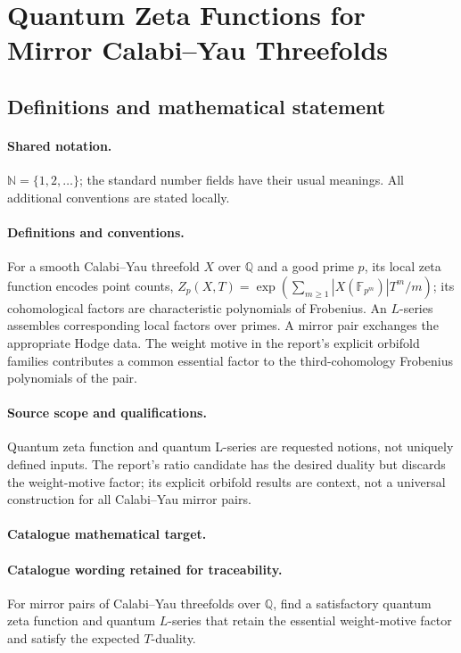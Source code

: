 \documentclass[11pt]{article}
\begin{document}
\section{Quantum Zeta Functions for Mirror Calabi–Yau Threefolds}\label{statement}

\subsection{Definitions and mathematical statement}

\paragraph{Shared notation.}$\mathbb N=\{1,2,\ldots\}$; the standard number fields have their usual meanings. All additional conventions are stated locally.


\paragraph{Definitions and conventions.} For a smooth Calabi--Yau threefold $X$ over $\mathbb Q$ and a good prime $p$, its local zeta function encodes point counts, $Z_p(X,T)=\exp(\sum_{m\ge1}|X(\mathbb F_{p^m})|T^m/m)$; its cohomological factors are characteristic polynomials of Frobenius. An $L$-series assembles corresponding local factors over primes. A mirror pair exchanges the appropriate Hodge data. The weight motive in the report's explicit orbifold families contributes a common essential factor to the third-cohomology Frobenius polynomials of the pair.

\paragraph{Source scope and qualifications.} Quantum zeta function and quantum L-series are requested notions, not uniquely defined inputs. The report's ratio candidate has the desired duality but discards the weight-motive factor; its explicit orbifold results are context, not a universal construction for all Calabi--Yau mirror pairs.

\paragraph{Catalogue mathematical target.}
\paragraph{Catalogue wording retained for traceability.}
For mirror pairs of Calabi–Yau threefolds over $\mathbb Q$, find a satisfactory quantum zeta function and quantum $L$-series that retain the essential weight-motive factor and satisfy the expected $T$-duality.
\end{document}
